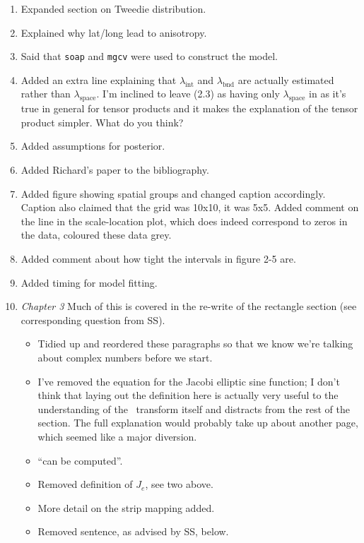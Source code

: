 \begin{enumerate}
\item {} Expanded section on Tweedie distribution.
\item {} Explained why lat/long lead to anisotropy.
\item {} Said that \texttt{soap} and \texttt{mgcv} were used to construct the model.
\item {} Added an extra line explaining that $\lambda_\text{int}$ and $\lambda_\text{bnd}$ are actually estimated rather than $\lambda_\text{space}$. I'm inclined to leave (2.3) as having only $\lambda_\text{space}$ in as it's true in general for tensor products and it makes the explanation of the tensor product simpler. What do you think?
\item {} Added assumptions for posterior.
\item {} Added Richard's paper to the bibliography.
\item {} Added figure showing spatial groups and changed caption accordingly. Caption also claimed that the grid was 10x10, it was 5x5. Added comment on the line in the scale-location plot, which does indeed correspond to zeros in the data, coloured these data grey.
\item {} Added comment about how tight the intervals in figure 2-5 are.
\item {} Added timing for model fitting.
\item \textit{Chapter 3}  Much of this is covered in the re-write of the rectangle section (see corresponding question from SS).
\begin{itemize}
	\item {} Tidied up and reordered these paragraphs so that we know we're talking about complex numbers before we start.
	\item {} I've removed the equation for the Jacobi elliptic sine function; I don't think that laying out the definition here is actually very useful to the understanding of the \sch\ transform itself and distracts from the rest of the section. The full explanation would probably take up about another page, which seemed like a major diversion.
	\item {} ``can be computed''.
	\item {} Removed definition of $J_e$, see two above.
	\item {} More detail on the strip mapping added.
	\item {} Removed sentence, as advised by SS, below.%

\end{itemize}
\end{enumerate}
